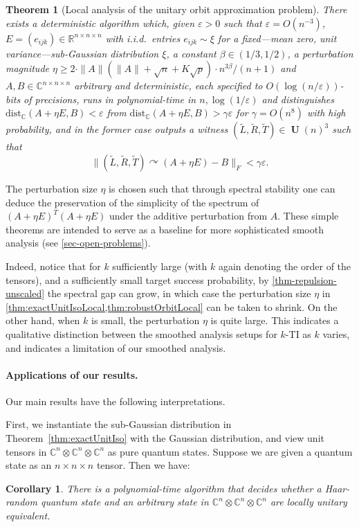 \documentclass[11pt]{article}
\numberwithin{equation}{section}
\newtheorem{theorem}{Theorem}[section]
\newtheorem{corollary}{Corollary}[section]
\theoremstyle{remark}
\DeclareMathOperator{\Unitary}{\textbf{U}}
\newcommand{\R}{\mathbb{R}}
\newcommand{\C}{\mathbb{C}}
\newcommand{\dist}{\mathrm{dist}}
\newcommand{\CC}{\mathbb{C}}
\begin{document}
\begin{theorem}[Local analysis of the unitary orbit approximation problem]\label{thm:robustOrbitLocal}
There exists a deterministic algorithm which, given $\varepsilon > 0$ such that $\varepsilon =O(n^{-3})$, $E=(e_{ijk})\in\R^{n\times n\times n}$ with i.i.d.\ entries $e_{ijk} \sim \xi$ for a fixed---mean zero, unit variance---sub-Gaussian distribution $\xi$, a constant $\beta \in (1/3, 1/2)$, a perturbation magnitude $\eta \geq 2 \cdot \|A\|(\|A\| + \sqrt{n} + K\sqrt{p})\cdot n^{3\beta}/(n + 1)$ and $A, B \in \C^{n\times n\times n}$ arbitrary and deterministic, each specified to $O(\log(n/\varepsilon))$-bits of precisions, runs in polynomial-time in $n,\log(1/\varepsilon)$ and distinguishes $\dist_\C(A + \eta E,B)<\varepsilon$ from $\dist_\C(A + \eta E,B)>\gamma\varepsilon$ for $\gamma = O(n^8)$ with high probability, and in the former case outputs a witness $(\widetilde{L},\widetilde{R},\widetilde{T})\in \Unitary(n)^3$ such that
\[
\|(\widetilde{L},\widetilde{R},\widetilde{T})\curvearrowright (A + \eta E)-B\|_F< \gamma\varepsilon.
\]
\end{theorem}
The perturbation size $\eta$ is chosen such that through spectral stability one can deduce the preservation of the simplicity of the spectrum of $(A + \eta E)^T(A + \eta E)$ under the additive perturbation from $A$. These simple theorems are intended to serve as a baseline for more sophisticated smooth analysis (see \cref{sec-open-problems}).

Indeed, notice that for $k$ sufficiently large (with $k$ again denoting the order of the tensors), and a sufficiently small target success probability, by \cref{thm-repulsion-unscaled} the spectral gap can grow, in which case the perturbation size $\eta$ in \cref{thm:exactUnitIsoLocal,thm:robustOrbitLocal} can be taken to shrink. On the other hand, when $k$ is small, the perturbation $\eta$ is quite large. This indicates a qualitative distinction between the smoothed analysis setups for $k$-TI as $k$ varies, and indicates a limitation of our smoothed analysis.




\paragraph{Applications of our results.} Our main results have the following interpretations. 

First, we instantiate the sub-Gaussian distribution in Theorem~\ref{thm:exactUnitIso} with the Gaussian distribution, and view unit tensors in $\CC^n\otimes \CC^n\otimes \CC^n$ as pure quantum states. Suppose we are given a quantum state as an $n\times n\times n$ tensor. Then we have: 
\begin{corollary}
    There is a polynomial-time algorithm that decides whether a Haar-random quantum state and an arbitrary state in $\CC^n\otimes \CC^n\otimes \CC^n$ are locally unitary equivalent. 
\end{corollary}
\end{document}
